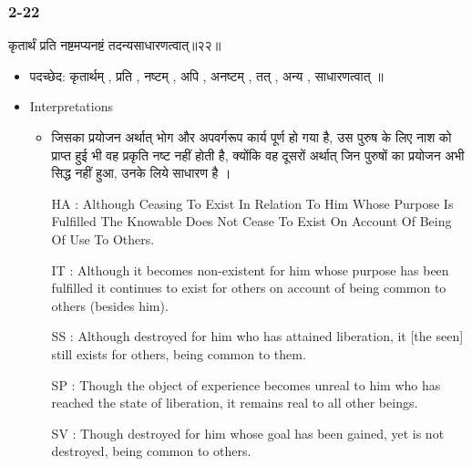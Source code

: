 \begin{frame}[fragile]\frametitle{2-22}
\begin{sanskrit}
कृतार्थं प्रति नष्टमप्यनष्टं तदन्यसाधारणत्वात्॥२२॥
\end{sanskrit}

	\begin{itemize}
	\item पदच्छेद: कृतार्थम् , प्रति , नष्टम् , अपि , अनष्टम् , तत् , अन्य , साधारणत्वात् ॥
	\item Interpretations
		\begin{itemize}
		\item जिसका प्रयोजन अर्थात् भोग और अपवर्गरूप कार्य पूर्ण हो गया है, उस पुरुष के लिए नाश को प्राप्त हुई भी वह प्रकृति नष्ट नहीं होती है, क्योंकि वह दूसरों अर्थात् जिन पुरुषों का प्रयोजन अभी सिद्ध नहीं हुआ, उनके लिये साधारण है ।
		\item [HA]: Although Ceasing To Exist In Relation To Him Whose Purpose Is Fulfilled The Knowable Does Not Cease To Exist On Account Of Being Of Use To Others.
		\item [IT]: Although it becomes non-existent for him whose purpose has been fulfilled it continues to exist for others on account of being common to others (besides him).
		\item [SS]: Although destroyed for him who has attained liberation, it [the seen] still exists for others, being common to them.
		\item [SP]: Though the object of experience becomes unreal to him who has reached the state of liberation, it remains real to all other beings.
		\item [SV]: Though destroyed for him whose goal has been gained, yet is not destroyed, being common to others. 
		\end{itemize}
	\end{itemize}

\end{frame}


